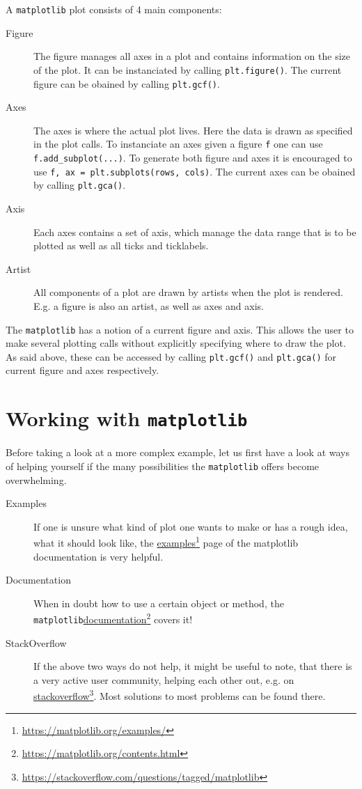 \documentclass[a4paper, 11pt, onecolumn]{article}
\newcommand{\mpl}{\texttt{matplotlib}\xspace}
\newcommand{\pl}[1]{\mbox{\texttt{#1}\xspace}}
\newcommand{\fref}[2]{\href{#1}{#2}\footnote{\url{#1}}}
\begin{document}
A \mpl plot consists of 4 main components:
\begin{description}
\item[Figure]
The figure manages all axes in a plot and contains information on the size of
the plot. It can be instanciated by calling \pl{plt.figure()}. 
The current figure can be obained by calling \pl{plt.gcf()}.

\item[Axes]
The axes is where the actual plot lives. Here the data is drawn
as specified in the plot calls. To instanciate an axes given a figure \pl{f}
one can use \pl{f.add\_subplot(...)}. To generate both figure and axes it
is encouraged to use \pl{f, ax = plt.subplots(rows, cols)}.
The current axes can be obained by calling \pl{plt.gca()}.

\item[Axis]
Each axes contains a set of axis, which manage the data range that is to be
plotted as well as all ticks and ticklabels.

\item[Artist]
All components of a plot are drawn by artists when the plot is rendered.
E.g. a figure is also an artist, as well as axes and axis.
\end{description}

The \mpl has a notion of a current figure and axis. This allows
the user to make several plotting calls without explicitly specifying where
to draw the plot. As said above, these can be accessed by calling 
\pl{plt.gcf()} and \pl{plt.gca()} for current figure and axes respectively.


\section{Working with \mpl}

Before taking a look at a more complex example, let us first have a look at
ways of helping yourself if the many possibilities the \mpl offers become overwhelming. 

\begin{description}
\item[Examples]
If one is unsure what kind of plot one wants to make or has a rough idea, what
it should look like, the \fref{https://matplotlib.org/examples/}{examples} page
of the matplotlib documentation is very helpful.
\item[Documentation]
When in doubt how to use a certain object or method, the
\mpl \fref{https://matplotlib.org/contents.html}{documentation} covers it! 
\item[StackOverflow]
If the above two ways do not help, it might be useful to note, that there is a
very active user community, helping each other out, e.g. on
\fref{https://stackoverflow.com/questions/tagged/matplotlib}{stackoverflow}.
Most solutions to most problems can be found there.
\end{description}
\end{document}
